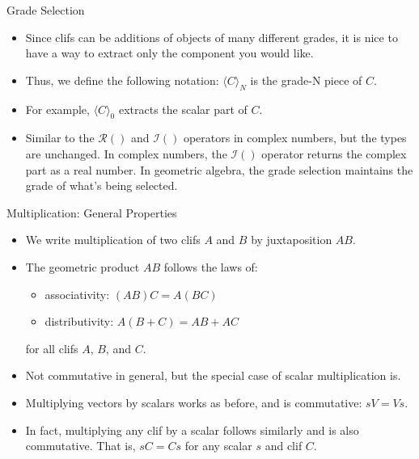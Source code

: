 \documentclass[aspectratio=169,xcolor=dvipsnames]{beamer}
\begin{document}
\begin{frame}{Grade Selection}

\begin{itemize}
      \item Since clifs can be additions of objects of many different grades,
            it is nice to have a way to extract only the component you would like.
      \item Thus, we define the following notation: $\langle C \rangle_N$ is the
            grade-N piece of $C$.
      \item For example, $\langle C \rangle_0$ extracts the scalar part of $C$.
      \item Similar to the $\mathcal{R}()$ and $\mathcal{I}()$ operators in complex numbers,
            but the types are unchanged. In complex numbers, the $\mathcal{I}()$ operator
            returns the complex part as a real number. In geometric algebra, the
            grade selection maintains the grade of what's being selected.
\end{itemize}
\end{frame}
      

\begin{frame}{Multiplication: General Properties}

\begin{itemize}
      \item We write multiplication of two clifs $A$ and $B$ by juxtaposition $AB$.
      \item The geometric product $AB$ follows the laws of:
            \begin{itemize}
                  \item associativity: $(AB)C = A(BC)$
                  \item distributivity: $A(B+C) = AB + AC$
            \end{itemize}
            for all clifs $A$, $B$, and $C$.
      \item Not commutative in general, but the special case of scalar multiplication is.
      \item Multiplying vectors by scalars works as before, and is commutative: $sV = Vs$.
      \item In fact, multiplying any clif by a scalar follows similarly and is also
            commutative. That is, $sC = Cs$ for any scalar $s$ and clif $C$.
\end{itemize}
\end{frame}
      
\end{document}
